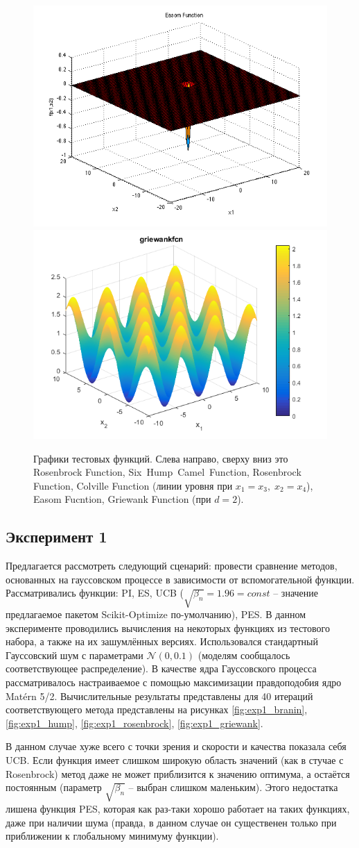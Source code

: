 \documentclass[12pt,fleqn]{article}
\begin{document}
\begin{figure}[!h]
		\includegraphics[width=0.5\linewidth]{test_functions/Easom.png}\includegraphics[width=0.5\linewidth]{test_functions/Griewank.png}
		\caption{Графики тестовых функций. Слева направо, сверху вниз это Rosenbrock Function, Six~Hump~Camel~Function, Rosenbrock Function, Colville Function (линии уровня при $x_1 = x_3,\; x_2 = x_4$), Easom Fucntion, Griewank Function (при $d=2$).}
	\end{figure}

	\newpage 
	\subsection{Эксперимент 1}
	Предлагается рассмотреть следующий сценарий: провести сравнение методов, основанных на гауссовском процессе в зависимости от вспомогательной функции. Рассматривались функции: PI, ES, UCB ($\sqrt{\beta_n} = 1.96 = \mathit{const}$ -- значение предлагаемое пакетом Scikit-Optimize по-умолчанию), PES. В данном эксперименте проводились вычисления на некоторых функциях из тестового набора, а также на их зашумлённых версиях. Использовался стандартный Гауссовский шум с параметрами $\mathcal{N}(0, 0.1)$ (моделям сообщалось соответствующее распределение). В качестве ядра Гауссовского процесса рассматривалось настраиваемое с помощью максимизации правдоподобия ядро Matérn 5/2. Вычислительные результаты представлены для 40 итераций соответствующего метода представлены на рисунках \ref{fig:exp1_branin}, \ref{fig:exp1_hump}, \ref{fig:exp1_rosenbrock}, \ref{fig:exp1_griewank}.
	
	В данном случае хуже всего с точки зрения и скорости и качества показала себя UCB. Если функция имеет слишком широкую область значений (как в стучае с Rosenbrock) метод даже не может приблизится к значению оптимума, а остаётся постоянным (параметр $\sqrt{\beta_n}$ -- выбран слишком маленьким). Этого недостатка лишена функция PES, которая как раз-таки хорошо работает на таких функциях, даже при наличии шума (правда, в данном случае он существенен только при приближении к глобальному минимуму функции).
	
\end{document}
